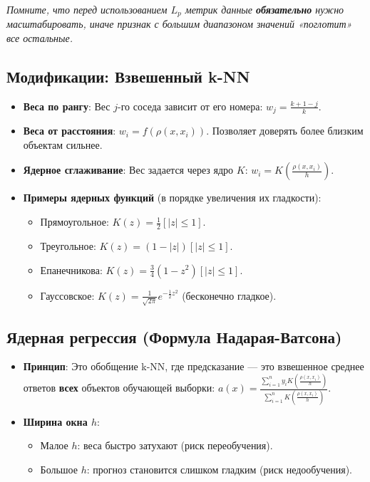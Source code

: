 \documentclass[12pt]{article}
\newcommand{\commentary}[1]{{\small\itshape\color{commentgray} #1}}
\begin{document}
\commentary{Помните, что перед использованием $L_p$ метрик данные \textbf{обязательно} нужно масштабировать, иначе признак с большим диапазоном значений «поглотит» все остальные.}

\subsection{Модификации: Взвешенный k-NN}

\begin{itemize}
    \item \textbf{Веса по рангу}: Вес $j$-го соседа зависит от его номера: $w_j = \frac{k+1-j}{k}$.
    \item \textbf{Веса от расстояния}: $w_i = f(\rho(x, x_i))$. Позволяет доверять более близким объектам сильнее.
    \item \textbf{Ядерное сглаживание}: Вес задается через ядро $K$: $w_i = K\left(\frac{\rho(x, x_i)}{h}\right)$. 
    \item \textbf{Примеры ядерных функций} (в порядке увеличения их гладкости): 
    \begin{itemize}
        \item Прямоугольное: $K(z) = \frac{1}{2} [|z| \le 1]$.
        \item Треугольное: $K(z) = (1 - |z|) [|z| \le 1]$.
        \item Епанечникова: $K(z) = \frac{3}{4} (1 - z^2) [|z| \le 1]$.
        \item Гауссовское: $K(z) = \frac{1}{\sqrt{2\pi}} e^{-\frac{1}{2}z^2}$ (бесконечно гладкое).
    \end{itemize}
\end{itemize}

\subsection{Ядерная регрессия (Формула Надарая-Ватсона)}

\begin{itemize}
    \item \textbf{Принцип}: Это обобщение k-NN, где предсказание — это взвешенное среднее ответов \textbf{всех} объектов обучающей выборки: 
    $a(x) = \frac{\sum_{i=1}^n y_i K\left(\frac{\rho(x, x_i)}{h}\right)}{\sum_{i=1}^n K\left(\frac{\rho(x, x_i)}{h}\right)}$.
    \item \textbf{Ширина окна $h$}: 
    \begin{itemize}
        \item Малое $h$: веса быстро затухают (риск переобучения).
        \item Большое $h$: прогноз становится слишком гладким (риск недообучения).
    \end{itemize}
\end{itemize}
\end{document}
